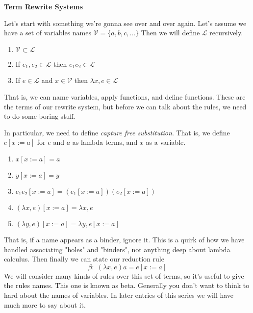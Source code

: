 \documentclass[12pt]{article}
\begin{document}
\baselineskip 12pt

\begin{center}
\textbf{\Large Term Rewrite Systems} \\
\end{center}
Let's start with something we're gonna see over and over again.
Let's assume we have a set of variables names $\mathcal{V} = \{a,b,c,...\}$
Then we will define $\mathcal{L}$ recursively.
\begin{enumerate}
    \item $\mathcal{V} \subset \mathcal{L}$
    \item If $e_1, e_2 \in \mathcal{L}$ then $e_1 e_2 \in \mathcal{L}$
    \item If $e \in \mathcal{L}$ and $x \in \mathcal{V}$ then $\lambda x, e \in \mathcal{L}$
\end{enumerate}
That is, we can name variables, apply functions, and define functions.
These are the terms of our rewrite system, but before we can talk about the rules, we need to do some boring stuff.

In particular, we need to define \textit{capture free substitution}. 
That is, we define $e[x:=a]$ for $e$ and $a$ as lambda terms, and $x$ as a variable.
\begin{enumerate}
    \item $x[x := a] = a$
    \item $y[x := a] = y$
    \item $e_1 e_2 [x := a] = (e_1 [x := a]) (e_2 [x := a])$
    \item $(\lambda x, e) [x := a] = \lambda x, e$
    \item $(\lambda y, e) [x := a] = \lambda y, e[x := a]$
\end{enumerate}

That is, if a name appears as a binder, ignore it.
This is a quirk of how we have handled associating "holes" and "binders", not anything deep about lambda calculus.
Then finally we can state our reduction rule
\[
\beta : \;  (\lambda x, e) a = e[x:=a]
\]
We will consider many kinds of rules over this set of terms, so it's useful to give the rules names. This one is known as beta.
Generally you don't want to think to hard about the names of variables.
In later entries of this series we will have much more to say about it.
\end{document}
